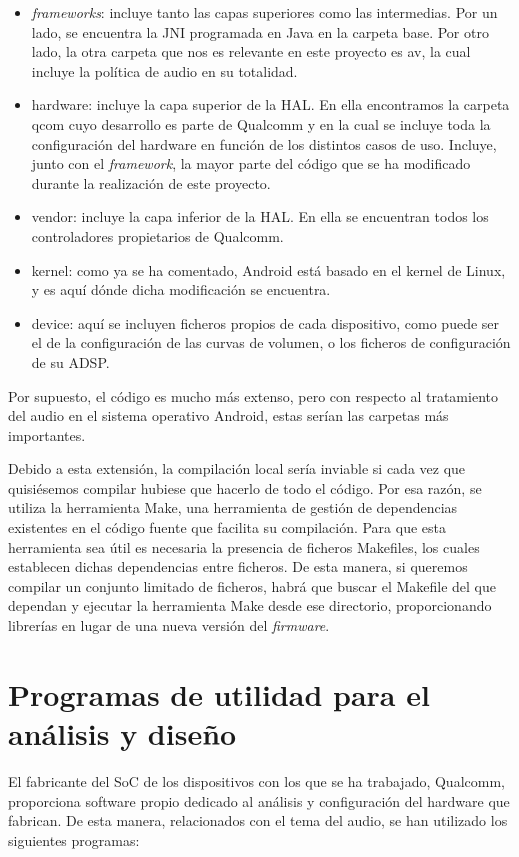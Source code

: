 \begin{itemize}
	\item{\textit{frameworks}: incluye tanto las capas superiores como las intermedias. Por un lado, se encuentra la \gls{JNI} programada en Java en la carpeta base. Por otro lado, la otra carpeta que nos es relevante en este proyecto es av, la cual incluye la política de audio en su totalidad.}
	\item{hardware: incluye la capa superior de la \gls{HAL}. En ella encontramos la carpeta qcom cuyo desarrollo es parte de Qualcomm y en la cual se incluye toda la configuración del hardware en función de los distintos casos de uso. Incluye, junto con el \textit{framework}, la mayor parte del código que se ha modificado durante la realización de este proyecto.}
	\item{vendor: incluye la capa inferior de la \gls{HAL}. En ella se encuentran todos los controladores propietarios de Qualcomm.}
	\item{kernel: como ya se ha comentado, Android está basado en el kernel de Linux, y es aquí dónde dicha modificación se encuentra.}
	\item{device: aquí se incluyen ficheros propios de cada dispositivo, como puede ser el de la configuración de las curvas de volumen, o los ficheros de configuración de su \gls{ADSP}.}	
\end{itemize}

Por supuesto, el código es mucho más extenso, pero con respecto al tratamiento del audio en el sistema operativo Android, estas serían las carpetas más importantes.

Debido a esta extensión, la compilación local sería inviable si cada vez que quisiésemos compilar hubiese que hacerlo de todo el código. Por esa razón, se utiliza la herramienta Make, una herramienta de gestión de dependencias existentes en el código fuente que facilita su compilación. Para que esta herramienta sea útil es necesaria la presencia de ficheros Makefiles, los cuales establecen dichas dependencias entre ficheros. De esta manera, si queremos compilar un conjunto limitado de ficheros, habrá que buscar el Makefile del que dependan y ejecutar la herramienta Make desde ese directorio, proporcionando librerías en lugar de una nueva versión del \textit{firmware}.


\section{Programas de utilidad para el análisis y diseño} \label{sec:programas}
El fabricante del \gls{SoC} de los dispositivos con los que se ha trabajado, Qualcomm, proporciona software propio dedicado al análisis y configuración del hardware que fabrican. De esta manera, relacionados con el tema del audio, se han utilizado los siguientes programas:

